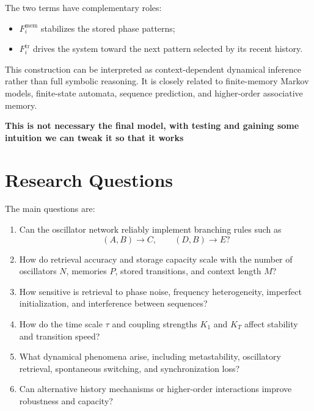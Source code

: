 \documentclass[11pt]{article}
\begin{document}
The two terms have complementary roles:
\begin{itemize}
    \item \(F_i^{\mathrm{mem}}\) stabilizes the stored phase patterns;
    \item \(F_i^{\mathrm{tr}}\) drives the system toward the next pattern selected by its recent history.
\end{itemize}

This construction can be interpreted as context-dependent dynamical inference rather than full symbolic reasoning. It is closely related to finite-memory Markov models, finite-state automata, sequence prediction, and higher-order associative memory.

\textbf{This is not necessary the final model, with testing and gaining some intuition we can tweak it so that it works}

\section{Research Questions}

The main questions are:

\begin{enumerate}
    \item Can the oscillator network reliably implement branching rules such as
    \[
    (A,B)\to C,
    \qquad
    (D,B)\to E?
    \]

    \item How do retrieval accuracy and storage capacity scale with the number of oscillators \(N\), memories \(P\), stored transitions, and context length \(M\)?

    \item How sensitive is retrieval to phase noise, frequency heterogeneity, imperfect initialization, and interference between sequences?

    \item How do the time scale \(\tau\) and coupling strengths \(K_1\) and \(K_T\) affect stability and transition speed?

    \item What dynamical phenomena arise, including metastability, oscillatory retrieval, spontaneous switching, and synchronization loss?

    \item Can alternative history mechanisms or higher-order interactions improve robustness and capacity?
\end{enumerate}
\end{document}
